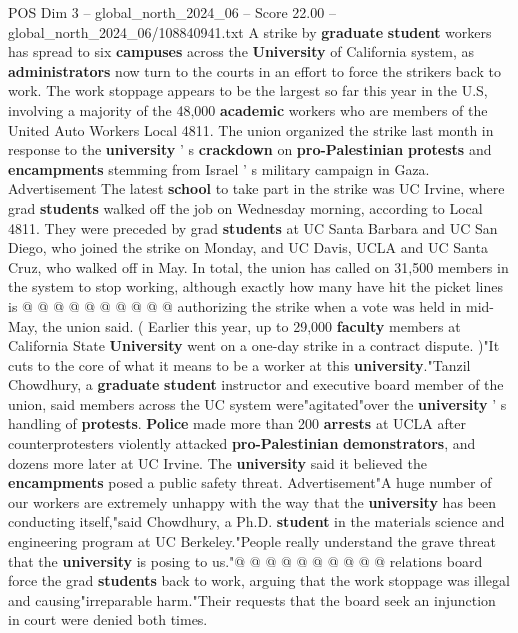 \begin{textsample}{POS Dim 3 – global\_north\_2024\_06 – Score 22.00 – global\_north\_2024\_06/108840941.txt}  \label{ex:f3_pos_069}
A strike by \textbf{graduate} \textbf{student} workers has spread to six \textbf{campuses} across the \textbf{University} of California system, as \textbf{administrators} now turn to the courts in an effort to force the strikers back to work.
The work stoppage appears to be the largest so far this year in the U.S, involving a majority of the 48,000 \textbf{academic} workers who are members of the United Auto Workers Local 4811.
The union organized the strike last month in response to the \textbf{university} ' s \textbf{crackdown} on \textbf{pro-Palestinian} \textbf{protests} and \textbf{encampments} stemming from Israel ' s military campaign in Gaza.
Advertisement The latest \textbf{school} to take part in the strike was UC Irvine, where grad \textbf{students} walked off the job on Wednesday morning, according to Local 4811.
They were preceded by grad \textbf{students} at UC Santa Barbara and UC San Diego, who joined the strike on Monday, and UC Davis, UCLA and UC Santa Cruz, who walked off in May.
In total, the union has called on 31,500 members in the system to stop working, although exactly how many have hit the picket lines is @ @ @ @ @ @ @ @ @ @ authorizing the strike when a vote was held in mid-May, the union said. ( Earlier this year, up to 29,000 \textbf{faculty} members at California State \textbf{University} went on a one-day strike in a contract dispute. )"It cuts to the core of what it means to be a worker at this \textbf{university}."Tanzil Chowdhury, a \textbf{graduate} \textbf{student} instructor and executive board member of the union, said members across the UC system were"agitated"over the \textbf{university} ' s handling of \textbf{protests}. \textbf{Police} made more than 200 \textbf{arrests} at UCLA after counterprotesters violently attacked \textbf{pro-Palestinian} \textbf{demonstrators}, and dozens more later at UC Irvine.
The \textbf{university} said it believed the \textbf{encampments} posed a public safety threat.
Advertisement"A huge number of our workers are extremely unhappy with the way that the \textbf{university} has been conducting itself,"said Chowdhury, a Ph.D. \textbf{student} in the materials science and engineering program at UC Berkeley."People really understand the grave threat that the \textbf{university} is posing to us."@ @ @ @ @ @ @ @ @ @ relations board force the grad \textbf{students} back to work, arguing that the work stoppage was illegal and causing"irreparable harm."Their requests that the board seek an injunction in court were denied both times.

\end{textsample}
